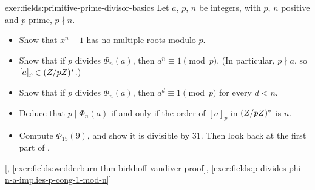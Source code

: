 \begin{exer}{}{exer:fields:primitive-prime-divisor-basics}
  Let $a$, $p$, $n$ be integers, with $p$, $n$ positive and $p$ prime,
  $p \nmid n$.
  \begin{itemize}
  \item Show that $x^n - 1$ has no multiple roots modulo $p$.
  \item Show that if $p$ divides $\Phi_n(a)$, then
    $a^n \equiv 1 \pmod{p}$.  (In particular, $p \nmid a$, so
    $[a]_p \in (Z/pZ)^*$.)
  \item Show that if $p$ divides $\Phi_n(a)$, then
    $a^d \equiv 1 \pmod{p}$ for every $d < n$.
  \item Deduce that $p \mid \Phi_n(a)$ if and only if the order of
    $[a]_p$ in $(Z/pZ)^*$ is $n$.
  \item Compute $\Phi_{15}(9)$, and show it is divisible by $31$. Then
    look back at the first part of .
  \end{itemize} [,
  \ref{exer:fields:wedderburn-thm-birkhoff-vandiver-proof},
  \ref{exer:fields:p-divides-phi-n-a-implies-p-cong-1-mod-n}]
\end{exer}
